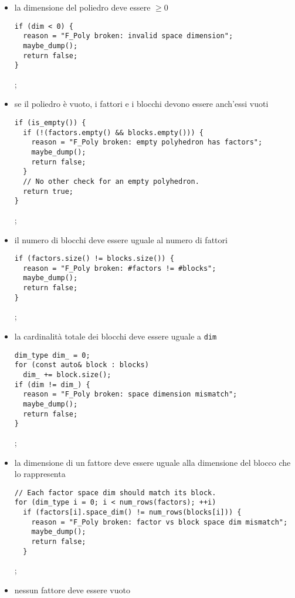 \documentclass{mimosis}
\theoremstyle{definition}
\begin{document}
\begin{itemize}
\item la dimensione del poliedro deve essere \(\ge 0\)
\lstset{style=mystyle,language=C++,label= ,caption= ,captionpos=b,numbers=none}
\begin{lstlisting}
if (dim < 0) {
  reason = "F_Poly broken: invalid space dimension";
  maybe_dump();
  return false;
}
\end{lstlisting}
;
\item se il poliedro è vuoto, i fattori e i blocchi devono essere anch'essi vuoti
\lstset{style=mystyle,language=C++,label= ,caption= ,captionpos=b,numbers=none}
\begin{lstlisting}
if (is_empty()) {
  if (!(factors.empty() && blocks.empty())) {
    reason = "F_Poly broken: empty polyhedron has factors";
    maybe_dump();
    return false;
  }
  // No other check for an empty polyhedron.
  return true;
}
\end{lstlisting}
;
\item il numero di blocchi deve essere uguale al numero di fattori
\lstset{style=mystyle,language=C++,label= ,caption= ,captionpos=b,numbers=none}
\begin{lstlisting}
if (factors.size() != blocks.size()) {
  reason = "F_Poly broken: #factors != #blocks";
  maybe_dump();
  return false;
}
\end{lstlisting}
;
\item la cardinalità totale dei blocchi deve essere uguale a \texttt{dim}
\lstset{style=mystyle,language=C++,label= ,caption= ,captionpos=b,numbers=none}
\begin{lstlisting}
dim_type dim_ = 0;
for (const auto& block : blocks)
  dim_ += block.size();
if (dim != dim_) {
  reason = "F_Poly broken: space dimension mismatch";
  maybe_dump();
  return false;
}
\end{lstlisting}
;
\item la dimensione di un fattore deve essere uguale alla dimensione del blocco
che lo rappresenta
\lstset{style=mystyle,language=C++,label= ,caption= ,captionpos=b,numbers=none}
\begin{lstlisting}
// Each factor space dim should match its block.
for (dim_type i = 0; i < num_rows(factors); ++i)
  if (factors[i].space_dim() != num_rows(blocks[i])) {
    reason = "F_Poly broken: factor vs block space dim mismatch";
    maybe_dump();
    return false;
  }
\end{lstlisting}
;
\item nessun fattore deve essere vuoto
\lstset{style=mystyle,language=C++,label= ,caption= ,captionpos=b,numbers=none}

\end{itemize}
\end{document}
